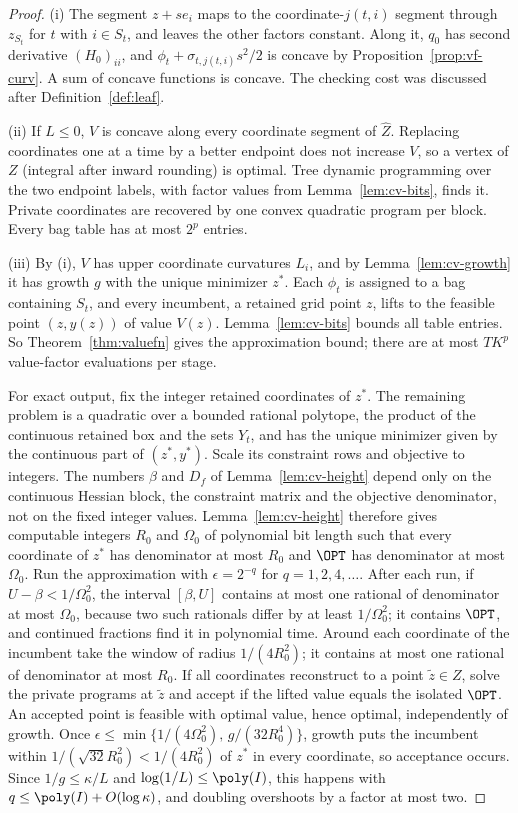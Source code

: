 \begin{proof}
(i) The segment $z+se_i$ maps to the coordinate-$j(t,i)$ segment through
$z_{S_t}$ for $t$ with $i\in S_t$, and leaves the other factors constant.
Along it, $q_0$ has second derivative $(H_0)_{ii}$, and
$\phi_t+\sigma_{t,j(t,i)}s^2/2$ is concave by Proposition~\ref{prop:vf-curv}.
A sum of concave functions is concave. The checking cost was discussed after
Definition~\ref{def:leaf}.

(ii) If $L\le0$, $V$ is concave along every coordinate segment of
$\widehat Z$. Replacing coordinates one at a time by a better endpoint does not
increase $V$, so a vertex of $Z$ (integral after inward rounding) is optimal.
Tree dynamic programming over the two endpoint labels, with factor values from
Lemma~\ref{lem:cv-bits}, finds it. Private coordinates are recovered by one
convex quadratic program per block. Every bag table has at most $2^p$ entries.

(iii) By (i), $V$ has upper coordinate curvatures $L_i$, and by
Lemma~\ref{lem:cv-growth} it has growth $g$ with the unique minimizer $z^*$.
Each $\phi_t$ is assigned to a bag containing $S_t$, and every incumbent, a
retained grid point $z$, lifts to the feasible point $(z,y(z))$ of value
$V(z)$. Lemma~\ref{lem:cv-bits} bounds all table entries. So
Theorem~\ref{thm:valuefn} gives the approximation bound; there are at most
$TK^p$ value-factor evaluations per stage.

For exact output, fix the integer retained coordinates of $z^*$. The
remaining problem is a quadratic over a bounded rational polytope, the product
of the continuous retained box and the sets $Y_t$, and has the unique
minimizer given by the continuous part of $(z^*,y^*)$. Scale its constraint
rows and objective to integers. The numbers $\beta$ and $D_f$ of
Lemma~\ref{lem:cv-height} depend only on the continuous Hessian block, the
constraint matrix and the objective denominator, not on the fixed integer
values. Lemma~\ref{lem:cv-height} therefore gives computable integers $R_0$
and $\Omega_0$ of polynomial bit length such that every coordinate of $z^*$ has
denominator at most $R_0$ and $\OPT$ has denominator at most $\Omega_0$. Run the
approximation with $\epsilon=2^{-q}$ for $q=1,2,4,\ldots$. After each run, if
$U-\beta<1/\Omega_0^2$, the interval $[\beta,U]$ contains at most one rational of
denominator at most $\Omega_0$, because two such rationals differ by at least
$1/\Omega_0^2$; it contains $\OPT$, and continued fractions find it in polynomial
time. Around each coordinate of the incumbent take the window of radius
$1/(4R_0^2)$; it contains at most one rational of denominator at most $R_0$. If
all coordinates reconstruct to a point $\tilde z\in Z$, solve the private
programs at $\tilde z$ and accept if the lifted value equals the isolated
$\OPT$. An accepted point is feasible with optimal value, hence optimal,
independently of growth. Once
$\epsilon\le\min\{1/(4\Omega_0^2),\,g/(32R_0^4)\}$, growth puts the incumbent within
$1/(\sqrt{32}R_0^2)<1/(4R_0^2)$ of $z^*$ in every coordinate, so acceptance
occurs. Since $1/g\le\kappa/L$ and $\log(1/L)\le\poly(I)$, this happens with
$q\le\poly(I)+O(\log\kappa)$, and doubling overshoots by a factor at most two.


\end{proof}
